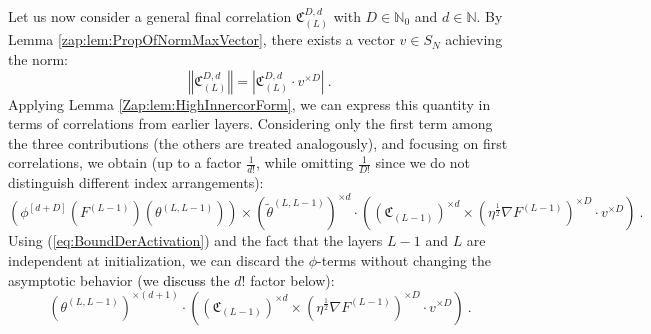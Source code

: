 \documentclass{article} %
\begin{document}
Let us now consider a general final correlation \(\mathfrak{C}_{(L)}^{D,d}\) with \(D\in\mathbb{N}_0\) and \(d\in\mathbb{N}\). By Lemma \ref{zap:lem:PropOfNormMaxVector}, there exists a vector \(v\in S_{N}\) achieving the norm:
\begin{equation}
\left\Vert \mathfrak{C}_{\left(L\right)}^{D,d}\right\Vert =\left|\mathfrak{C}_{\left(L\right)}^{D,d}\cdot v^{\times D}\right| \ .
\end{equation}
Applying Lemma \ref{Zap:lem:HighInnercorForm}, we can express this quantity in terms of correlations from earlier layers. Considering only the first term among the three contributions (the others are treated analogously), and focusing on first correlations, we obtain (up to a factor \(\frac{1}{d!}\), while omitting \(\frac{1}{D!}\) since we do not distinguish different index arrangements):
\begin{equation}
\left(\phi^{\left[d+D\right]}\left(F^{\left(L-1\right)}\right)\left(\theta^{\left(L,L-1\right)}\right)\right)\times\left(\tilde{\theta}^{\left(L,L-1\right)}\right)^{\times d}\cdot\left(\left(\mathfrak{C}_{\left(L-1\right)}\right)^{\times d}\times\left(\eta^{\frac{1}{2}}\nabla F^{\left(L-1\right)}\right)^{\times D}\cdot v^{\times D}\right) \ .
\end{equation}
Using (\ref{eq:BoundDerActivation}) and the fact that the layers \(L-1\) and \(L\) are independent at initialization, we can discard the \(\phi\)-terms without changing the asymptotic behavior (we \textcolor{black}{discuss} the \(d!\) factor below):
\begin{equation}
\left(\theta^{\left(L,L-1\right)}\right)^{\times (d+1)}\cdot\left(\left(\mathfrak{C}_{\left(L-1\right)}\right)^{\times d}\times\left(\eta^{\frac{1}{2}}\nabla F^{\left(L-1\right)}\right)^{\times D}\cdot v^{\times D}\right) \ .
\end{equation}
\end{document}
